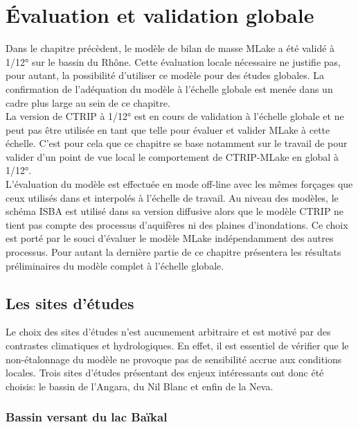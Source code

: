 \chapter{{\selectfont \'Evaluation et validation globale}}
\label{chap:etude-globale}
\minitoc

\noindent Dans le chapitre précèdent, le modèle de bilan de masse MLake a été validé à 1/12° sur le bassin du Rhône. Cette évaluation locale nécessaire ne justifie pas, pour autant, la possibilité d'utiliser ce modèle pour des études globales. La confirmation de l'adéquation du modèle à l'échelle globale est menée dans un cadre plus large au sein de ce chapitre.\\
La version de CTRIP à 1/12° est en cours de validation à l'échelle globale et ne peut pas être utilisée en tant que telle pour évaluer et valider MLake à cette échelle. C'est pour cela que ce chapitre se base notamment sur le travail de \citet{decharme2019} pour valider d'un point de vue local le comportement de CTRIP-MLake en global à 1/12°.\\
L'évaluation du modèle est effectuée en mode off-line avec les mêmes forçages que ceux utilisés dans \citet{decharme2019} et interpolés à l'échelle de travail. Au niveau des modèles, le schéma ISBA est utilisé dans sa version diffusive alors que le modèle CTRIP ne tient pas compte des processus d'aquifères ni des plaines d'inondations. Ce choix est porté par le souci d'évaluer le modèle MLake indépendamment des autres processus. Pour autant la dernière partie de ce chapitre présentera les résultats préliminaires du modèle complet à l'échelle globale. 

\section{{\selectfont Les sites d'études}}
\label{sec:bv-globe}

Le choix des sites d'études n'est aucunement arbitraire et est motivé par des contrastes climatiques et hydrologiques. En effet, il est essentiel de vérifier que le non-étalonnage du modèle ne provoque pas de sensibilité accrue aux conditions locales. Trois sites d'études présentant des enjeux intéressants ont donc été choisis: le bassin de l'Angara, du Nil Blanc et enfin de la Neva.

\subsection{{\selectfont Bassin versant du lac Baïkal}}
\label{sec:baikal}
